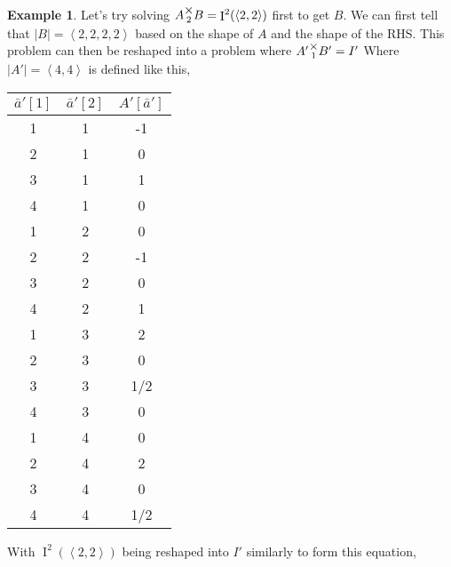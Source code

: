 \documentclass[12pt]{book}
\theoremstyle{plain}
\theoremstyle{definition}
\newtheorem{example}{Example}[chapter]
\theoremstyle{ppart}
\theoremstyle{case}
\theoremstyle{solution}
\DeclareMathOperator{\Ident}{I}
\newcommand{\mmult}[1]{\text{\raisebox{1ex}{$\underset{#1}{\times}$}}}
\newcommand{\shape}[1]{\left|#1\right|}
\begin{document}
\begin{example}
Let's try solving $A \mmult{2} B = \Ident^2(\left<2,2\right>)$ first to get $B$.
We can first tell that $\shape{B} = \left<2,2,2,2\right>$ based on the shape of $A$ and
the shape of the RHS.
This problem can then be reshaped into a problem where $A' \mmult{1} B' = I'$
Where $\shape{A'} = \left<4,4\right>$ is defined like this,

\begin{table}[h!]
\begin{center}
\begin{tabular}{c c | c}
$\bar{a}'[1]$ & $\bar{a}'[2]$ & $A'[\bar{a}']$ \\
\hline
1           & 1           & -1 \\
2           & 1           & 0 \\
3           & 1           & 1 \\
4           & 1           & 0 \\

1           & 2           & 0 \\
2           & 2           & -1 \\
3           & 2           & 0 \\
4           & 2           & 1 \\

1           & 3           & 2 \\
2           & 3           & 0 \\
3           & 3           & 1/2 \\
4           & 3           & 0 \\

1           & 4           & 0 \\
2           & 4           & 2 \\
3           & 4           & 0 \\
4           & 4           & 1/2
\end{tabular}
\end{center}
\end{table}

With $\Ident^2(\left<2,2\right>)$ being reshaped into $I'$ similarly to form this equation,


\end{example}
\end{document}
